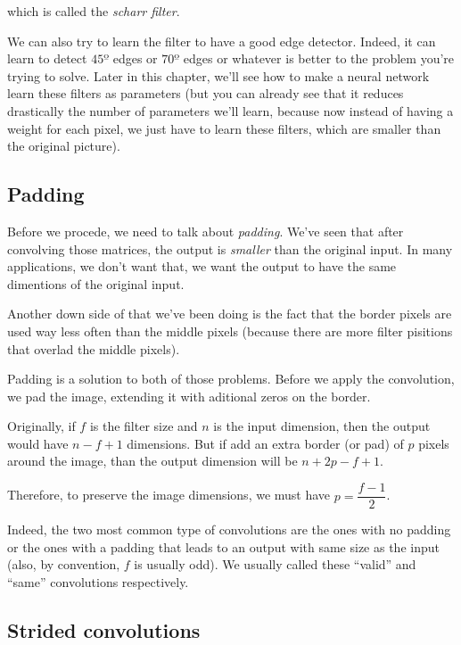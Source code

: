 \documentclass[12pt, a4paper, oneside]{book}
\begin{document}
which is called the \textit{scharr filter}.

We can also try to learn the filter to have a good edge detector. Indeed, it can
learn to detect $45º$ edges or $70º$ edges or whatever is better to the problem
you're trying to solve. Later in this chapter, we'll see how to make a neural
network learn these filters as parameters (but you can already see that it
reduces drastically the number of parameters we'll learn, because now instead of
having a weight for each pixel, we just have to learn these filters, which are
smaller than the original picture).

\subsection{Padding}%
\label{sub:padding}

Before we procede, we need to talk about \textit{padding}. We've seen that after
convolving those matrices, the output is \textit{smaller} than the original
input. In many applications, we don't want that, we want the output to have the
same dimentions of the original input.

Another down side of that we've been doing is the fact that the border pixels
are used way less often than the middle pixels (because there are more filter
pisitions that overlad the middle pixels).

Padding is a solution to both of those problems. Before we apply the
convolution, we pad the image, extending it with aditional zeros on the border.

Originally, if $f$ is the filter size and $n$ is the input dimension, then the
output would have $n-f+1$ dimensions. But if add an extra border (or pad) of $p$
pixels around the image, than the output dimension will be $n+2p-f+1$.

Therefore, to preserve the image dimensions, we must have $p = \dfrac{f-1}{2}$.

Indeed, the two most common type of convolutions are the ones with no padding or
the ones with a padding that leads to an output with same size as the input
(also, by convention, $f$ is usually odd). We usually called these ``valid'' and
``same'' convolutions respectively.

\subsection{Strided convolutions}%
\label{sub:strided_convolutions}
\end{document}
